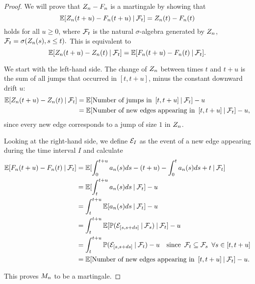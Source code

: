 \begin{proof} \label{P: decomp Zn}
	We will prove that $Z_n - F_n$ is a martingale by showing that
	\begin{equation} \label{E: Mn martingale}
	\mathbb{E}[ Z_n(t+u) - F_n(t+u) \: | \: \mathcal{F}_{t} ] = Z_n(t) - F_n(t)
	\end{equation}
	holds for all $u \geq 0$, where $\mathcal{F}_{t}$ is the natural $\sigma$-algebra generated by $Z_n$, 
	$\mathcal{F}_{t} = \sigma(Z_n(s), s \leq t).$
	This is equivalent to 
	\begin{equation}
	\mathbb{E}[Z_n(t+u) - Z_n(t) \: | \: \mathcal{F}_{t}] = \mathbb{E}[F_n(t+u) - F_n(t) \: | \: \mathcal{F}_{t}].
	\end{equation}
	
	We start with the left-hand side. 
	The change of $Z_n$ between times $t$ and $t+u$ is the sum of all jumps that occurred in $[t, t+u]$,
	minus the constant downward drift $u$:
	\begin{align*}
	\mathbb{E}[Z_n(t+u) - Z_n(t) \: | \: \mathcal{F}_{t}] 
	&= \mathbb{E}[\text{Number of jumps in} \enspace [t, t+u] \: | \: \mathcal{F}_{t}] - u \\
	&= \mathbb{E}[\text{Number of new edges appearing in} \enspace [t, t+u] \: | \: \mathcal{F}_{t}] - u,
	\end{align*}
	since every new edge corresponds to a jump of size $1$ in $Z_n$.
	
	Looking at the right-hand side, we define $\mathcal{E}_{I}$ as the event of a new edge appearing during the time interval $I$ and calculate
	\begin{align*}
	\mathbb{E}[F_n(t+u) - F_n(t) \: | \: \mathcal{F}_{t}]
	&= \mathbb{E}[ \int_{0}^{t+u} a_n(s)ds - (t+u) - \int_{0}^{t} a_n(s)ds + t \: | \: \mathcal{F}_{t} ] \\
	&= \mathbb{E}[ \int_{t}^{t+u} a_n(s)ds \: | \: \mathcal{F}_{t} ] - u \\
	&= \int_{t}^{t+u} \mathbb{E}[a_n(s)ds \: | \: \mathcal{F}_{t}] - u \\
	&= \int_{t}^{t+u} \mathbb{E}[ \mathbb{P}(\mathcal{E}_{[s, s+ds]} \: | \: \mathcal{F}_{s}) \: | \: \mathcal{F}_{t} ] - u\\
	&= \int_{t}^{t+u} \mathbb{P}( \mathcal{E}_{[s, s+ds]} \: | \: \mathcal{F}_{t} ) - u
	\quad \text{since} \enspace \mathcal{F}_{t} \subseteq \mathcal{F}_{s} \enspace \forall s \in [t,t+u] \\
	&= \mathbb{E}[\text{Number of new edges appearing in} \enspace [t, t+u] \: | \: \mathcal{F}_{t}] - u.
	\end{align*}
	
	This proves $M_n$ to be a martingale. 	
\end{proof}

